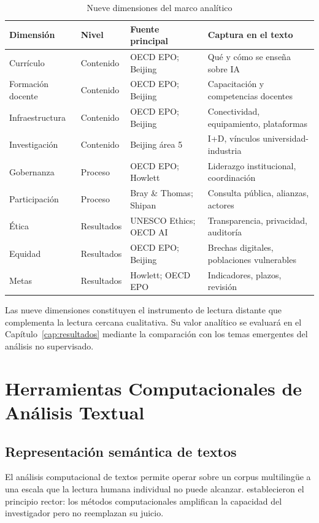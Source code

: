 \begin{table}[htbp]
\centering
\caption{Nueve dimensiones del marco analítico}
\label{tab:dimensiones}
\small
\begin{tabular}{llll}
\hline
\textbf{Dimensión} & \textbf{Nivel} & \textbf{Fuente principal} & \textbf{Captura en el texto} \\
\hline
Currículo & Contenido & OECD EPO; Beijing & Qué y cómo se enseña sobre IA \\
Formación docente & Contenido & OECD EPO; Beijing & Capacitación y competencias docentes \\
Infraestructura & Contenido & OECD EPO; Beijing & Conectividad, equipamiento, plataformas \\
Investigación & Contenido & Beijing área 5 & I+D, vínculos universidad-industria \\
\hline
Gobernanza & Proceso & OECD EPO; Howlett & Liderazgo institucional, coordinación \\
Participación & Proceso & Bray \& Thomas; Shipan & Consulta pública, alianzas, actores \\
\hline
Ética & Resultados & UNESCO Ethics; OECD AI & Transparencia, privacidad, auditoría \\
Equidad & Resultados & OECD EPO; Beijing & Brechas digitales, poblaciones vulnerables \\
Metas & Resultados & Howlett; OECD EPO & Indicadores, plazos, revisión \\
\hline
\end{tabular}
\end{table}

Las nueve dimensiones constituyen el instrumento de lectura distante que complementa la lectura cercana cualitativa. Su valor analítico se evaluará en el Capítulo~\ref{cap:resultados} mediante la comparación con los temas emergentes del análisis no supervisado.


\section{Herramientas Computacionales de Análisis Textual}
\label{sec:nlp-pedagogia}

\subsection{Representación semántica de textos}

El análisis computacional de textos permite operar sobre un corpus multilingüe a una escala que la lectura humana individual no puede alcanzar. \citet{grimmer2013text} establecieron el principio rector: los métodos computacionales amplifican la capacidad del investigador pero no reemplazan su juicio.

